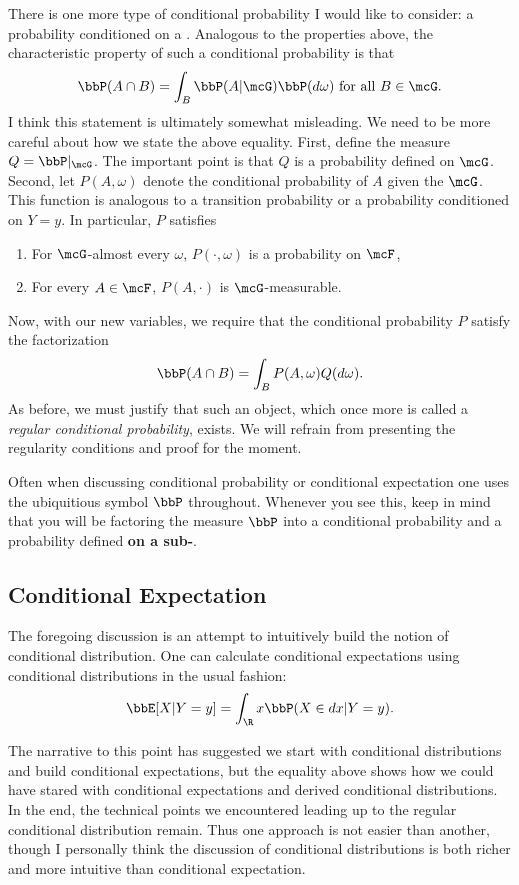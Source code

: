 \documentclass{report}
\begin{document}
There is one more type of conditional probability I would like to consider: a probability conditioned on a \sigalg.  Analogous to the properties above, the characteristic property of such a conditional probability is that
\[
\bbP(A \cap B) = \int_B \bbP(A | \mcG) \bbP(d \omega) \textmd{ for all } B \in \mcG.
\]
I think this statement is ultimately somewhat misleading.  We need to be more careful about how we state the above equality.  First, define the measure $Q = \bbP|_\mcG$.  The important point is that $Q$ is a probability defined on $\mcG$.  Second, let $P(A,\omega)$ denote the conditional probability of $A$ given the \sigalg $\mcG$.  This function is analogous to a transition probability or a probability conditioned on $Y=y$.  In particular, $P$ satisfies
\begin{enumerate}
\item  For $\mcG$-almost every $\omega$, $P(\cdot, \omega)$ is a probability on $\mcF$,
\item For every $A \in \mcF$, $P(A,\cdot)$ is $\mcG$-measurable.
\end{enumerate}
Now, with our new variables, we require that the conditional probability $P$ satisfy the factorization
\[
\bbP(A \cap B) = \int_B P(A, \omega) Q(d \omega).
\]
As before, we must justify that such an object, which once more is called a \emph{regular conditional probability}, exists.  We will refrain from presenting the regularity conditions and proof for the moment.

Often when discussing conditional probability or conditional expectation one uses the ubiquitious symbol $\bbP$ throughout.  Whenever you see this, keep in mind that you will be factoring the measure $\bbP$ into a conditional probability and a probability defined \textbf{on a sub-\sigalg}.

\subsection{Conditional Expectation}

The foregoing discussion is an attempt to intuitively build the notion of conditional distribution.  One can calculate conditional expectations using conditional distributions in the usual fashion:
\[
\bbE[X | Y = y] = \int_\R x \bbP(X \in dx | Y = y).
\]

The narrative to this point has suggested we start with conditional distributions and build conditional expectations, but the equality above shows how we could have stared with conditional expectations and derived conditional distributions.  In the end, the technical points we encountered leading up to the regular conditional distribution remain.  Thus one approach is not easier than another, though I personally think the discussion of conditional distributions is both richer and more intuitive than conditional expectation.
\end{document}
